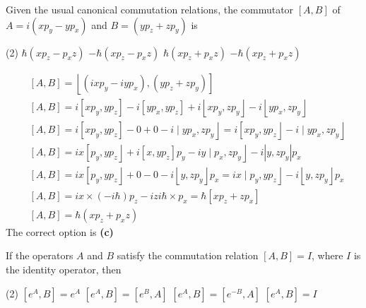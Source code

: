 \begin{enumerate}
\begin{answer}
\end{answer}
\begin{minipage}{\textwidth}
	\item Given the usual canonical commutation relations, the commutator $[A, B]$ of $A=i\left(x p_{y}-y p_{x}\right)$ and $B=\left(y p_{z}+z p_{y}\right)$ is
\end{minipage}
\begin{tasks}(2)
	\task[\textbf{A.}] $\hbar\left(x p_{z}-p_{x} z\right)$
	\task[\textbf{B.}]$-\hbar\left(x p_{z}-p_{x} z\right)$
	\task[\textbf{C.}]$\hbar\left(x p_{z}+p_{x} z\right)$
	\task[\textbf{D.}]$-\hbar\left(x p_{z}+p_{x} z\right)$
\end{tasks}
\begin{answer}

	\begin{align*}
		&[A, B]=\left\lfloor\left(i x p_{y}-i y p_{x}\right),\left(y p_{z}+z p_{y}\right)\right]\\
		&{[A, B]=i\left[x p_{y}, y p_{z}\right]-i\left[y p_{x}, y p_{z}\right]+i\left\lfloor x p_{y}, z p_{y}\right\rfloor-i\left\lfloor y p_{x}, z p_{y}\right\rfloor} \\
		&\left.\left.[A, B]=i\left[x p_{y}, y p_{z}\right]-0+0-i \mid y p_{x}, z p_{y}\right\rfloor=i\left[x p_{y}, y p_{z}\right\rfloor-i \mid y p_{x}, z p_{y}\right\rfloor \\
		&\left.[A, B]=i x\left[p_{y}, y p_{z}\right\rfloor+i\left[x, y p_{z}\right] p_{y}-i y \mid p_{x}, z p_{y}\right\rfloor-i\left|y, z p_{y}\right| p_{x} \\
		&\left.[A, B]=i x\left[p_{y}, y p_{z}\right\rfloor+0-0-i\left\lfloor y, z p_{y}\right\rfloor p_{x}=i x \mid p_{y}, y p_{z}\right\rfloor-i\left\lfloor y, z p_{y}\right\rfloor p_{x} \\
		&{[A, B]=i x \times(-i \hbar) p_{z}-i z i \hbar \times p_{x}=\hbar\left[x p_{z}+z p_{x}\right]} \\
		&{[A, B]=\hbar\left(x p_{z}+p_{x} z\right)}
	\end{align*}
	The correct option is \textbf{(c)}
\end{answer}
\begin{minipage}{\textwidth}
	\item If the operators $A$ and $B$ satisfy the commutation relation $[A, B]=I$, where $I$ is the identity operator, then
\end{minipage}
\begin{tasks}(2)
	\task[\textbf{A.}] $\left[e^{A}, B\right]=e^{A}$
	\task[\textbf{B.}]$\left[e^{A}, B\right]=\left[e^{B}, A\right]$
	\task[\textbf{C.}]$\left[e^{A}, B\right]=\left[e^{-B}, A\right]$
	\task[\textbf{D.}]$\left[e^{A}, B\right]=I$
\end{tasks}


\end{enumerate}
